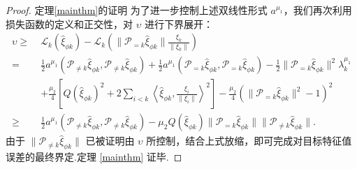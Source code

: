 \begin{proof}{定理\ref{mainthm}的证明}
为了进一步控制上述双线性形式 $a^{\mu_{1}}$，我们再次利用损失函数的定义和正交性，对 $\upsilon$ 进行下界展开：
$$
\begin{aligned}
\upsilon \geq\;& \mathcal{L}_{k}(\widehat{\xi}_{\phi k})-\mathcal{L}_{k}\left(\| \mathcal{P}_{= k}\widehat{\xi}_{\phi k}\|\frac{\xi_{k}}{\|\xi_{k}\|}\right)\\
=\;& \frac{1}{2}a^{\mu_{1}}\left(\mathcal{P}_{\neq k} \widehat{\xi}_{\phi k}, \mathcal{P}_{\neq k} \widehat{\xi}_{\phi k}\right)+\frac{1}{2}a^{\mu_{1}}\left(\mathcal{P}_{= k} \widehat{\xi}_{\phi k}, \mathcal{P}_{= k} \widehat{\xi}_{\phi k}\right)-\frac{1}{2}\| \mathcal{P}_{= k}\widehat{\xi}_{\phi k}\|^{2}\lambda_{k}^{\mu_{1}}\\
&+\frac{\mu_{2}}{4}\left[Q(\widehat{\xi}_{\phi k})^{2}+2\sum\limits_{i<k}\left\langle \widehat{\xi}_{\phi k},\frac{\xi_{i}}{\|\xi_{i}\|} \right\rangle^{2} \right]-\frac{\mu_{2}}{4}\left(\| \mathcal{P}_{= k}\widehat{\xi}_{\phi k}\|^{2}-1\right)^{2}\\
\geq\;& \frac{1}{2}a^{\mu_{1}}\left(\mathcal{P}_{\neq k} \widehat{\xi}_{\phi k}, \mathcal{P}_{\neq k} \widehat{\xi}_{\phi k}\right)-\mu_{2}Q(\widehat{\xi}_{\phi k})\| \mathcal{P}_{= k}\widehat{\xi}_{\phi k}\|\| \mathcal{P}_{\neq k}\widehat{\xi}_{\phi k}\|.
\end{aligned}
$$
由于 $\|\mathcal{P}_{\neq k}\widehat{\xi}_{\phi k}\|$ 已被证明由 $\upsilon$ 所控制，结合上式放缩，即可完成对目标特征值误差的最终界定.定理 \ref{mainthm} 证毕.
\end{proof}

